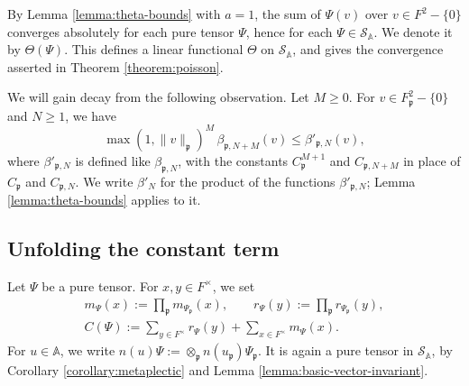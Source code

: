\documentclass[reqno]{amsart}
\theoremstyle{plain}
\theoremstyle{definition}
\theoremstyle{itplain}
\numberwithin{equation}{section}
\numberwithin{theorem}{section}
\begin{document}
By Lemma \ref{lemma:theta-bounds} with $a = 1$, the sum of $\Psi(v)$ over $v \in F^2 - \{0\}$ converges absolutely for each pure tensor $\Psi$, hence for each $\Psi \in \mathcal{S}_{\mathbb{A}}$.  We denote it by $\Theta(\Psi)$.  This defines a linear functional $\Theta$ on $\mathcal{S}_{\mathbb{A}}$, and gives the convergence asserted in Theorem \ref{theorem:poisson}.

We will gain decay from the following observation.  Let $M \geq 0$.  For $v \in F_{\mathfrak{p}}^2 - \{0\}$ and $N \geq 1$, we have
\begin{equation}\label{eq:weighted-bounds}
  \max(1, \lVert v \rVert_{\mathfrak{p}})^M \, \beta_{\mathfrak{p}, N + M}(v) \leq \beta'_{\mathfrak{p}, N}(v),
\end{equation}
where $\beta'_{\mathfrak{p}, N}$ is defined like $\beta_{\mathfrak{p}, N}$, with the constants $C_{\mathfrak{p}}^{M+1}$ and $C_{\mathfrak{p}, N + M}$ in place of $C_{\mathfrak{p}}$ and $C_{\mathfrak{p}, N}$.  We write $\beta'_N$ for the product of the functions $\beta'_{\mathfrak{p}, N}$; Lemma \ref{lemma:theta-bounds} applies to it.

\subsection{Unfolding the constant term}\label{sec:unipotent-average}
Let $\Psi$ be a pure tensor.  For $x, y \in F^\times$, we set
\begin{gather*}
  m_\Psi(x) := \prod_{\mathfrak{p}} m_{\Psi_{\mathfrak{p}}}(x),
  \qquad
  r_\Psi(y) := \prod_{\mathfrak{p}} r_{\Psi_{\mathfrak{p}}}(y),
  \\
  C(\Psi) := \sum_{y \in F^\times} r_\Psi(y) + \sum_{x \in F^\times} m_\Psi(x).
\end{gather*}
For $u \in \mathbb{A}$, we write $n(u) \Psi := \otimes_{\mathfrak{p}} n(u_{\mathfrak{p}}) \Psi_{\mathfrak{p}}$.  It is again a pure tensor in $\mathcal{S}_{\mathbb{A}}$, by Corollary \ref{corollary:metaplectic} and Lemma \ref{lemma:basic-vector-invariant}.
\end{document}
